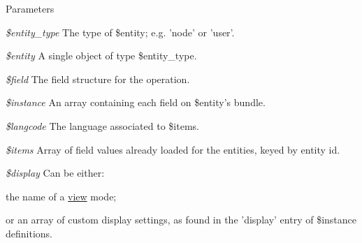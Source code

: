 \begin{DoxyParams}{Parameters}
\item[{\em \$entity\_\-type}]The type of \$entity; e.g. 'node' or 'user'. \item[{\em \$entity}]A single object of type \$entity\_\-type. \item[{\em \$field}]The field structure for the operation. \item[{\em \$instance}]An array containing each field on \$entity's bundle. \item[{\em \$langcode}]The language associated to \$items. \item[{\em \$items}]Array of field values already loaded for the entities, keyed by entity id. \item[{\em \$display}]Can be either:
\begin{DoxyItemize}
\item the name of a \hyperlink{classview}{view} mode;
\item or an array of custom display settings, as found in the 'display' entry of \$instance definitions. 
\end{DoxyItemize}\end{DoxyParams}
